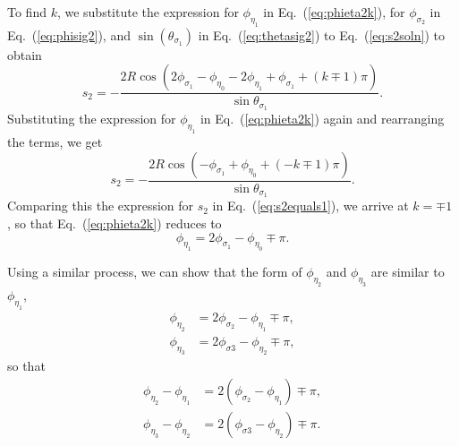 \documentclass[a4paper,twocolumn,superscriptaddress]{revtex4-1}
\begin{document}
{To find $k$, we substitute the expression for $\phi_{ \eta_1 }$ in Eq.~(\ref{eq:phieta2k}), for $\phi_{ \sigma_2 }$ in Eq.~(\ref{eq:phisig2}), and $\sin (\theta_{ \sigma_1 })$ in Eq.~(\ref{eq:thetasig2}) to Eq.~(\ref{eq:s2soln}) to obtain
\begin{equation}
  s_2
  = 
  - \frac{2 R \cos(2\phi_{ \sigma_1 } - \phi_{ \eta_0 } -2\phi_{ \eta_1 } + \phi_{ \sigma_1 } + (k \mp 1) \pi )}
{\sin \theta_{ \sigma_1 }} .
\end{equation}
Substituting the expression for $\phi_{ \eta_1 }$ in Eq.~(\ref{eq:phieta2k}) again and rearranging the terms, we get
\begin{equation}
  s_2
  = 
  - \frac{2 R \cos(-\phi_{ \sigma_1 } + \phi_{ \eta_0 } + (-k \mp 1) \pi )}
{\sin \theta_{ \sigma_1 }} .
\end{equation}
Comparing this the expression for $s_2$ in Eq.~(\ref{eq:s2equals1}), we arrive at
$k= \mp 1$ ,
so that Eq.~(\ref{eq:phieta2k}) reduces to
\begin{equation}
\label{eq:phieta2soln}
\phi_{ \eta_1 } = 2\phi_{ \sigma_1 } - \phi_{ \eta_0 } \mp \pi .
\end{equation}

Using a similar process, we can show that the form of $\phi_{ \eta_2 }$ and $\phi_{ \eta_3 }$ are similar to $\phi_{ \eta_1 }$, 
\begin{subequations}
\begin{align}
\label{eq:phieta3}
\phi_{ \eta_2 } &= 2\phi_{ \sigma_2 } - \phi_{ \eta_1 } \mp \pi ,
\\
\label{eq:phieta4}
\phi_{ \eta_3 } &= 2\phi_{\sigma 3} - \phi_{ \eta_2 } \mp \pi ,
\end{align}
\end{subequations}
so that %
\begin{subequations}
\begin{align}
\label{eq:deltaeta3eta2}
\phi_{ \eta_2 } - \phi_{ \eta_1 } &=  2(\phi_{ \sigma_2 } - \phi_{ \eta_1 }) \mp \pi ,
\\
\label{eq:deltaeta4eta3}
\phi_{ \eta_3 } - \phi_{ \eta_2 } &= 2(\phi_{\sigma 3} - \phi_{ \eta_2 }) \mp \pi .
\end{align}
\end{subequations}

}
\end{document}
